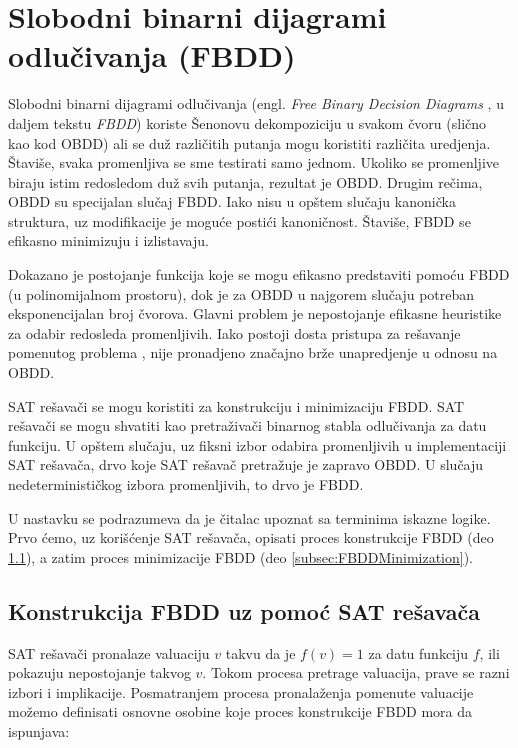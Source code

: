 \section{Slobodni binarni dijagrami odlu\v{c}ivanja (FBDD)}
\label{sec:FBDD}

Slobodni binarni dijagrami odlu\v{c}ivanja (engl. \emph{Free Binary Decision Diagrams} \cite{FBDD}, u daljem tekstu \emph{FBDD}) koriste \v{S}enonovu dekompoziciju u svakom \v{c}voru (sli\v{c}no kao kod OBDD) ali se du\v{z} razli\v{c}itih putanja mogu koristiti razli\v{c}ita uredjenja. \v{S}tavi\v{s}e, svaka promenljiva se sme testirati samo jednom. Ukoliko se promenljive biraju istim redosledom du\v{z} svih putanja, rezultat je OBDD. Drugim re\v{c}ima, OBDD su specijalan slu\v{c}aj FBDD. Iako nisu u op\v{s}tem slu\v{c}aju kanoni\v{c}ka struktura, uz modifikacije je mogu\'c{}e posti\'c{}i kanoni\v{c}nost. \v{S}tavi\v{s}e, FBDD se efikasno minimizuju i izlistavaju.

Dokazano je  postojanje funkcija koje se mogu efikasno predstaviti pomo\'c{}u FBDD (u polinomijalnom prostoru), dok je za OBDD u najgorem slu\v{c}aju potreban eksponencijalan broj \v{c}vorova. Glavni problem je nepostojanje efikasne heuristike za odabir redosleda promenljivih. Iako postoji dosta pristupa za re\v{s}avanje pomenutog problema \cite{FBDD}, nije pronadjeno zna\v{c}ajno br\v{z}e unapredjenje u odnosu na OBDD.

SAT re\v{s}ava\v{c}i se mogu koristiti za konstrukciju i minimizaciju FBDD. SAT re\v{s}ava\v{c}i se mogu shvatiti kao pretra\v{z}iva\v{c}i binarnog stabla odlu\v{c}ivanja za datu funkciju. U op\v{s}tem slu\v{c}aju, uz fiksni izbor odabira promenljivih u implementaciji SAT re\v{s}ava\v{c}a, drvo koje SAT re\v{s}ava\v{c} pretra\v{z}uje je zapravo OBDD. U slu\v{c}aju nedeterministi\v{c}kog izbora promenljivih, to drvo je FBDD.

U nastavku se podrazumeva da je \v{c}italac upoznat sa terminima iskazne logike. Prvo \'c{}emo, uz kori\v{s}\'c{}enje SAT re\v{s}ava\v{c}a, opisati proces konstrukcije FBDD (deo \ref{subsec:FBDDConstructionViaSAT}), a zatim proces minimizacije FBDD (deo \ref{subsec:FBDDMinimization}).


\subsection{Konstrukcija FBDD uz pomo\'c{} SAT re\v{s}ava\v{c}a}
\label{subsec:FBDDConstructionViaSAT}

SAT re\v{s}ava\v{c}i pronalaze valuaciju $v$ takvu da je $f(v) = 1$ za datu funkciju $f$, ili pokazuju nepostojanje takvog $v$. Tokom procesa pretrage valuacija, prave se razni izbori i implikacije. Posmatranjem procesa pronala\v{z}enja pomenute valuacije mo\v{z}emo definisati osnovne osobine koje proces konstrukcije FBDD mora da ispunjava:

